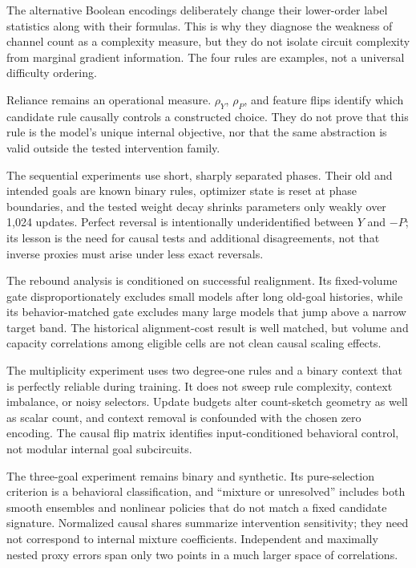 \documentclass[11pt,a4paper]{article}
\newcommand{\rhoY}{\rho_Y}
\newcommand{\rhoP}{\rho_P}
\begin{document}
The alternative Boolean encodings deliberately change their lower-order label statistics along with their formulas. This is why they diagnose the weakness of channel count as a complexity measure, but they do not isolate circuit complexity from marginal gradient information. The four rules are examples, not a universal difficulty ordering.

Reliance remains an operational measure. $\rhoY$, $\rhoP$, and feature flips identify which candidate rule causally controls a constructed choice. They do not prove that this rule is the model's unique internal objective, nor that the same abstraction is valid outside the tested intervention family.

The sequential experiments use short, sharply separated phases. Their old and intended goals are known binary rules, optimizer state is reset at phase boundaries, and the tested weight decay shrinks parameters only weakly over 1,024 updates. Perfect reversal is intentionally underidentified between $Y$ and $-P$; its lesson is the need for causal tests and additional disagreements, not that inverse proxies must arise under less exact reversals.

The rebound analysis is conditioned on successful realignment. Its fixed-volume gate disproportionately excludes small models after long old-goal histories, while its behavior-matched gate excludes many large models that jump above a narrow target band. The historical alignment-cost result is well matched, but volume and capacity correlations among eligible cells are not clean causal scaling effects.

The multiplicity experiment uses two degree-one rules and a binary context that is perfectly reliable during training. It does not sweep rule complexity, context imbalance, or noisy selectors. Update budgets alter count-sketch geometry as well as scalar count, and context removal is confounded with the chosen zero encoding. The causal flip matrix identifies input-conditioned behavioral control, not modular internal goal subcircuits.

The three-goal experiment remains binary and synthetic. Its pure-selection criterion is a behavioral classification, and ``mixture or unresolved'' includes both smooth ensembles and nonlinear policies that do not match a fixed candidate signature. Normalized causal shares summarize intervention sensitivity; they need not correspond to internal mixture coefficients. Independent and maximally nested proxy errors span only two points in a much larger space of correlations.
\end{document}
